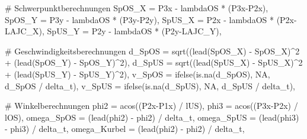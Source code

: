 \documentclass[
  letterpaper,
  DIV=11]{scrartcl}
\newenvironment{Shaded}{\begin{snugshade}}{\end{snugshade}}
\newcommand{\AttributeTok}[1]{\textcolor[rgb]{0.40,0.45,0.13}{#1}}
\newcommand{\CommentTok}[1]{\textcolor[rgb]{0.37,0.37,0.37}{#1}}
\newcommand{\ConstantTok}[1]{\textcolor[rgb]{0.56,0.35,0.01}{#1}}
\newcommand{\DecValTok}[1]{\textcolor[rgb]{0.68,0.00,0.00}{#1}}
\newcommand{\FunctionTok}[1]{\textcolor[rgb]{0.28,0.35,0.67}{#1}}
\newcommand{\NormalTok}[1]{\textcolor[rgb]{0.00,0.23,0.31}{#1}}
\newcommand{\SpecialCharTok}[1]{\textcolor[rgb]{0.37,0.37,0.37}{#1}}
\begin{document}
\begin{Shaded}
\begin{Highlighting}[]
    \CommentTok{\# Schwerpunktberechnungen}
    \AttributeTok{SpOS\_X =}\NormalTok{ P3x }\SpecialCharTok{{-}}\NormalTok{ lambdaOS }\SpecialCharTok{*}\NormalTok{ (P3x}\SpecialCharTok{{-}}\NormalTok{P2x),}
    \AttributeTok{SpOS\_Y =}\NormalTok{ P3y }\SpecialCharTok{{-}}\NormalTok{ lambdaOS }\SpecialCharTok{*}\NormalTok{ (P3y}\SpecialCharTok{{-}}\NormalTok{P2y),}
    \AttributeTok{SpUS\_X =}\NormalTok{ P2x }\SpecialCharTok{{-}}\NormalTok{ lambdaOS }\SpecialCharTok{*}\NormalTok{ (P2x}\SpecialCharTok{{-}}\NormalTok{LAJC\_X),}
    \AttributeTok{SpUS\_Y =}\NormalTok{ P2y }\SpecialCharTok{{-}}\NormalTok{ lambdaOS }\SpecialCharTok{*}\NormalTok{ (P2y}\SpecialCharTok{{-}}\NormalTok{LAJC\_Y),}
    
    \CommentTok{\# Geschwindigkeitsberechnungen}
    \AttributeTok{d\_SpOS =} \FunctionTok{sqrt}\NormalTok{((}\FunctionTok{lead}\NormalTok{(SpOS\_X) }\SpecialCharTok{{-}}\NormalTok{ SpOS\_X)}\SpecialCharTok{\^{}}\DecValTok{2} \SpecialCharTok{+}\NormalTok{ (}\FunctionTok{lead}\NormalTok{(SpOS\_Y) }\SpecialCharTok{{-}}\NormalTok{ SpOS\_Y)}\SpecialCharTok{\^{}}\DecValTok{2}\NormalTok{),}
    \AttributeTok{d\_SpUS =} \FunctionTok{sqrt}\NormalTok{((}\FunctionTok{lead}\NormalTok{(SpUS\_X) }\SpecialCharTok{{-}}\NormalTok{ SpUS\_X)}\SpecialCharTok{\^{}}\DecValTok{2} \SpecialCharTok{+}\NormalTok{ (}\FunctionTok{lead}\NormalTok{(SpUS\_Y) }\SpecialCharTok{{-}}\NormalTok{ SpUS\_Y)}\SpecialCharTok{\^{}}\DecValTok{2}\NormalTok{),}
    \AttributeTok{v\_SpOS =} \FunctionTok{ifelse}\NormalTok{(}\FunctionTok{is.na}\NormalTok{(d\_SpOS), }\ConstantTok{NA}\NormalTok{, d\_SpOS }\SpecialCharTok{/}\NormalTok{ delta\_t),}
    \AttributeTok{v\_SpUS =} \FunctionTok{ifelse}\NormalTok{(}\FunctionTok{is.na}\NormalTok{(d\_SpUS), }\ConstantTok{NA}\NormalTok{, d\_SpUS }\SpecialCharTok{/}\NormalTok{ delta\_t),}
    
    \CommentTok{\# Winkelberechnungen}
    \AttributeTok{phi2 =} \FunctionTok{acos}\NormalTok{((P2x}\SpecialCharTok{{-}}\NormalTok{P1x) }\SpecialCharTok{/}\NormalTok{ lUS),}
    \AttributeTok{phi3 =} \FunctionTok{acos}\NormalTok{((P3x}\SpecialCharTok{{-}}\NormalTok{P2x) }\SpecialCharTok{/}\NormalTok{ lOS),}
    \AttributeTok{omega\_SpOS =}\NormalTok{ (}\FunctionTok{lead}\NormalTok{(phi2) }\SpecialCharTok{{-}}\NormalTok{ phi2) }\SpecialCharTok{/}\NormalTok{ delta\_t,}
    \AttributeTok{omega\_SpUS =}\NormalTok{ (}\FunctionTok{lead}\NormalTok{(phi3) }\SpecialCharTok{{-}}\NormalTok{ phi3) }\SpecialCharTok{/}\NormalTok{ delta\_t,}
    \AttributeTok{omega\_Kurbel =}\NormalTok{ (}\FunctionTok{lead}\NormalTok{(phi2) }\SpecialCharTok{{-}}\NormalTok{ phi2) }\SpecialCharTok{/}\NormalTok{ delta\_t,}
    

\end{Highlighting}
\end{Shaded}
\end{document}
